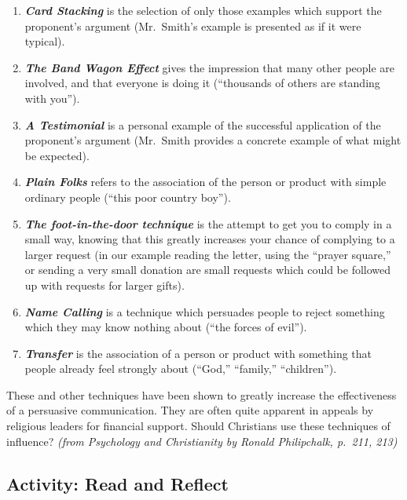 \documentclass[
]{book}
\providecommand{\tightlist}{%
  \setlength{\itemsep}{0pt}\setlength{\parskip}{0pt}}
\begin{document}
\begin{enumerate}
\def\labelenumi{\arabic{enumi}.}
\tightlist
\item
  \textbf{\emph{Card Stacking}} is the selection of only those examples which support the proponent's argument (Mr.~Smith's example is presented as if it were typical).\\
\item
  \textbf{\emph{The Band Wagon Effect}} gives the impression that many other people are involved, and that everyone is doing it (``thousands of others are standing with you'').\\
\item
  \textbf{\emph{A Testimonial}} is a personal example of the successful application of the proponent's argument (Mr.~Smith provides a concrete example of what might be expected).\\
\item
  \textbf{\emph{Plain Folks}} refers to the association of the person or product with simple ordinary people (``this poor country boy'').\\
\item
  \textbf{\emph{The foot-in-the-door technique}} is the attempt to get you to comply in a small way, knowing that this greatly increases your chance of complying to a larger request (in our example reading the letter, using the ``prayer square,'' or sending a very small donation are small requests which could be followed up with requests for larger gifts).\\
\item
  \textbf{\emph{Name Calling}} is a technique which persuades people to reject something which they may know nothing about (``the forces of evil'').\\
\item
  \textbf{\emph{Transfer}} is the association of a person or product with something that people already feel strongly about (``God,'' ``family,'' ``children'').
\end{enumerate}

These and other techniques have been shown to greatly increase the effectiveness of a persuasive communication. They are often quite apparent in appeals by religious leaders for financial support. Should Christians use these techniques of influence? \emph{(from Psychology and Christianity by Ronald Philipchalk, p.~211, 213)}

\hypertarget{activity-read-and-reflect-9}{%
\subsection*{Activity: Read and Reflect}\label{activity-read-and-reflect-9}}
\end{document}
